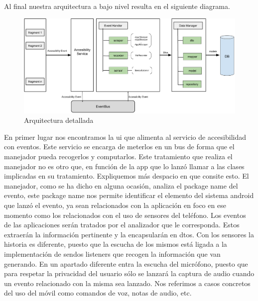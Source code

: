\documentclass[12pt,a4paper,oneside]{book} %
\begin{document}
Al final nuestra arquitectura a bajo nivel resulta en el siguiente diagrama. 
\begin{figure}[H]
		\includegraphics[width=1.3\textwidth,center]{pictures/architecture/arquitecturaGeneral03.png} 
	\caption[Arquitectura detallada]{Arquitectura detallada}
\end{figure}
En primer lugar nos encontramos la ui que alimenta al servicio de accesibilidad con eventos. Este servicio se encarga de meterlos en un bus de forma que el manejador pueda recogerlos y computarlos. 
\newline \newline
Este tratamiento que realiza el manejador no es otro que, en función de la app que lo lanzó llamar a las clases implicadas en su tratamiento.
\newline \newline
Expliquemos más despacio en que consite esto. El manejador, como se ha dicho en alguna ocasión, analiza el package name del evento, este package name nos permite identificar el elemento del sistema android que lanzó el evento, ya sean relacionados con la aplicación en foco en ese momento como los relacionados con el uso de sensores del teléfono. 
\newline \newline
Los eventos de las aplicaciones serán tratados por el analizador que le corresponda. Estos extraerán la información pertinente y la encapsularán en dtos. 
\newline \newline
Con los sensores la historia es diferente, puesto que la escucha de los mismos está ligada a la implementación de sendos listeners que recogen la información que van generando. En un apartado diferente entra la escucha del micrófono, puesto que para respetar la privacidad del usuario sólo se lanzará la captura de audio cuando un evento relacionado con la misma sea lanzado. Nos referimos a casos concretos del uso del móvil como comandos de voz, notas de audio, etc. 
\end{document}
